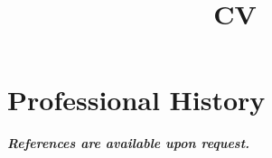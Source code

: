 \documentclass[12pt,a4paper]{moderncv}
\title{CV}
\begin{document}
\maketitle







\clearpage



%

\clearpage


%

\section{Professional History}











\emph{\textbf{References are available upon request.}}


\end{document}
